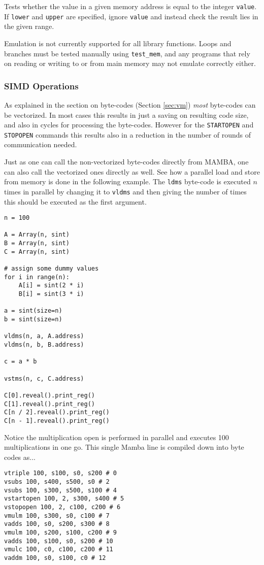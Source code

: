 Tests whether the value in a given memory address is equal to the integer
\verb|value|. If \verb|lower| and \verb|upper| are specified, ignore \verb|value|
and instead check the result lies in the given range.

Emulation is not currently supported for all library functions. Loops and
branches must be tested manually using \verb|test_mem|, and any programs that
rely on reading or writing to or from main memory may not emulate correctly
either.

\subsubsection{SIMD Operations}
As explained in the section on byte-codes (Section \ref{sec:vm}) {\em most} byte-codes
can be vectorized.
In most cases this results in just a saving on resulting code size, and also
in cycles for processing the byte-codes.
However for the \verb|STARTOPEN| and \verb|STOPOPEN| commands this
results also in a reduction in the number of rounds of communication needed.

Just as one can call the non-vectorized byte-codes directly from MAMBA, one
can also call the vectorized ones directly as well. See how a parallel
load and store from memory is done in the following example.
The \verb|ldms| byte-code is executed $n$ times in parallel by
changing it to \verb|vldms| and then giving the number of
times this should be executed as the first argument.
\begin{lstlisting}
n = 100

A = Array(n, sint)
B = Array(n, sint)
C = Array(n, sint)

# assign some dummy values
for i in range(n):
    A[i] = sint(2 * i)
    B[i] = sint(3 * i)

a = sint(size=n)
b = sint(size=n)

vldms(n, a, A.address)
vldms(n, b, B.address)

c = a * b

vstms(n, c, C.address)

C[0].reveal().print_reg()
C[1].reveal().print_reg()
C[n / 2].reveal().print_reg()
C[n - 1].reveal().print_reg()
\end{lstlisting}
Notice the multiplication open is performed in parallel and executes
100 multiplications in one go.
This single Mamba line is compiled down into byte codes as...
\begin{lstlisting}
vtriple 100, s100, s0, s200 # 0
vsubs 100, s400, s500, s0 # 2
vsubs 100, s300, s500, s100 # 4
vstartopen 100, 2, s300, s400 # 5
vstopopen 100, 2, c100, c200 # 6
vmulm 100, s300, s0, c100 # 7
vadds 100, s0, s200, s300 # 8
vmulm 100, s200, s100, c200 # 9
vadds 100, s100, s0, s200 # 10
vmulc 100, c0, c100, c200 # 11
vaddm 100, s0, s100, c0 # 12
\end{lstlisting}

